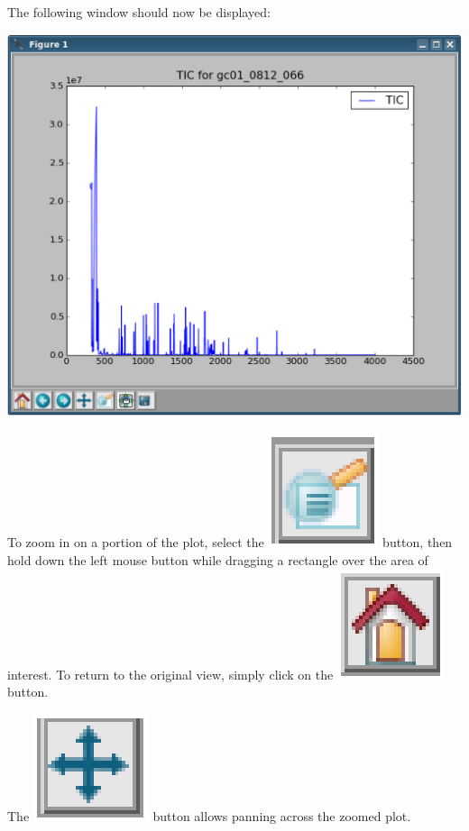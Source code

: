 The following window should now be displayed:

\begin{center}
\includegraphics[scale=0.33]{graphics/chapter07/test-70a.eps}
\end{center}

To zoom in on a portion of the plot, select the
\includegraphics[scale=0.5]{graphics/chapter07/magnifier_button.eps}
button, then hold down the 
left mouse button while dragging a rectangle over the area of interest. To return
to the original view, simply click on the
\includegraphics[scale=0.5]{graphics/chapter07/home_button.eps}
button.

The 
\includegraphics[scale=0.5]{graphics/chapter07/cross_button.eps}
button allows panning across the zoomed plot. 


